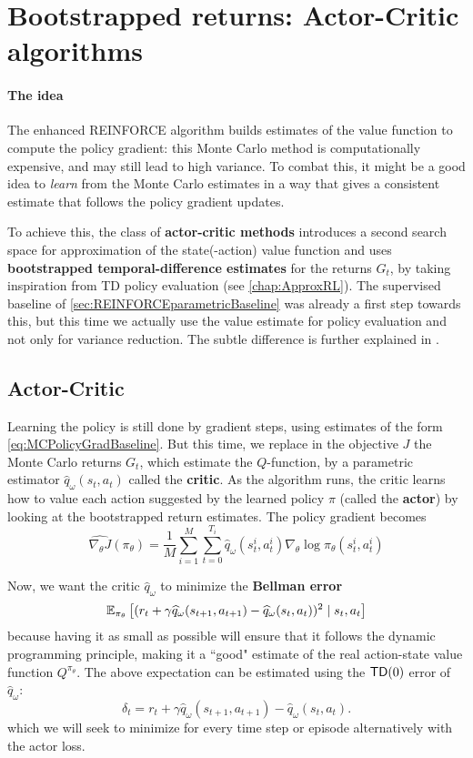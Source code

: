\documentclass[../course-notes.tex]{subfiles}
\begin{document}
\section{Bootstrapped returns: Actor-Critic algorithms}


\paragraph{The idea} The enhanced REINFORCE algorithm builds estimates of the value function to compute the policy gradient: this Monte Carlo method is computationally expensive, and may still lead to high variance. To combat this, it might be a good idea to \textit{learn} from the Monte Carlo estimates in a way that gives a consistent estimate that follows the policy gradient updates.

To achieve this, the class of \textbf{\bluefont actor-critic methods} introduces a second search space for approximation of the state(-action) value function and uses \textbf{bootstrapped temporal-difference estimates} for the returns $G_t$, by taking inspiration from TD policy evaluation (see \cref{chap:ApproxRL}). The supervised baseline of \cref{sec:REINFORCEparametricBaseline} was already a first step towards this, but this time we actually use the value estimate for policy evaluation and not only for variance reduction. The subtle difference is further explained in \cite[chap.\ 13.5]{Sutton1998}.

\subsection{Actor-Critic}


Learning the policy is still done by gradient steps, using estimates of the form \cref{eq:MCPolicyGradBaseline}. But this time, we replace in the objective $J$ the Monte Carlo returns $G_t$, which estimate the $Q$-function, by a parametric estimator $\widehat{q}_\omega(s_t, a_t)$ called the \textbf{\bluefont critic}. As the algorithm runs, the critic learns how to value each action suggested by the learned policy $\pi$ (called the \textbf{\bluefont actor}) by looking at the bootstrapped return estimates. The policy gradient becomes
\begin{equation}\label{eq:ActorPolicyGrad}
\widehat{\nabla_\theta J}(\pi_\theta) =
\frac{1}{M}\sum_{i=1}^M
\sum_{t=0}^{T_i} \widehat{q}_\omega(s^i_t,a^i_t)
\nabla_\theta \log\pi_\theta(s^i_t, a^i_t)
\end{equation}

Now, we want the critic $\widehat{q}_\omega$ to minimize the \textbf{Bellman error}
\[
\operatorname{\mathbb{E}}_{\pi_\theta}\left[
(r_t + \gamma\widehat{q}_\omega(s_{t+1}, a_{t+1}) - \widehat{q}_\omega(s_t,a_t))^2
\mid s_t, a_t
\right]
\]
because having it as small as possible will ensure that it follows the dynamic programming principle, making it a ``good" estimate of the real action-state value function $Q^{\pi_\theta}$. The above expectation can be estimated using the $\mathsf{TD}(0)$ error of $\widehat{q}_\omega$:
\[
\delta_t = r_t + \gamma\widehat{q}_\omega(s_{t+1}, a_{t+1}) - \widehat{q}_\omega(s_t,a_t).
\]
which we will seek to minimize for every time step or episode alternatively with the actor loss.
\end{document}
